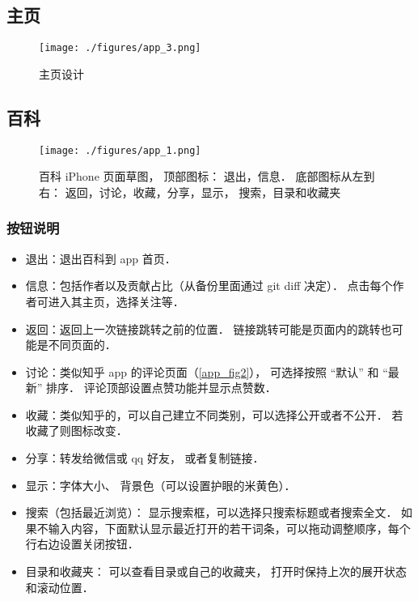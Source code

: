 
\begin{issues}
\issueDraft
\end{issues}

\subsection{主页}

\begin{figure}[ht]
\centering
\texttt{[image: ./figures/app\_3.png]}
\caption{主页设计} \label{app_fig3}
\end{figure}

\subsection{百科}
\begin{figure}[ht]
\centering
\texttt{[image: ./figures/app\_1.png]}
\caption{百科 iPhone 页面草图， 顶部图标： 退出，信息． 底部图标从左到右： 返回，讨论，收藏，分享，显示， 搜索，目录和收藏夹}\label{app_fig1}
\end{figure}

\subsubsection{按钮说明}
\begin{itemize}
\item 退出：退出百科到 app 首页．
\item 信息：包括作者以及贡献占比（从备份里面通过 git diff 决定）． 点击每个作者可进入其主页，选择关注等．
\item 返回：返回上一次链接跳转之前的位置． 链接跳转可能是页面内的跳转也可能是不同页面的．
\item 讨论：类似知乎 app 的评论页面（\autoref{app_fig2}）， 可选择按照 “默认” 和 “最新” 排序． 评论顶部设置点赞功能并显示点赞数．
\item 收藏：类似知乎的，可以自己建立不同类别，可以选择公开或者不公开． 若收藏了则图标改变．
\item 分享：转发给微信或 qq 好友， 或者复制链接．
\item 显示：字体大小、 背景色（可以设置护眼的米黄色）．
\item 搜索（包括最近浏览）： 显示搜索框，可以选择只搜索标题或者搜索全文． 如果不输入内容，下面默认显示最近打开的若干词条，可以拖动调整顺序，每个行右边设置关闭按钮．
\item 目录和收藏夹： 可以查看目录或自己的收藏夹， 打开时保持上次的展开状态和滚动位置．
\end{itemize}

